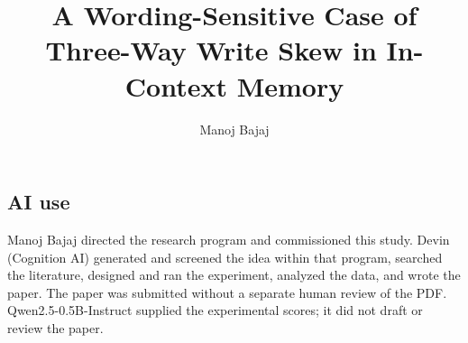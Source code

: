\documentclass[11pt]{article}
\title{\textbf{A Wording-Sensitive Case of Three-Way Write Skew in In-Context Memory}}
\author{Manoj Bajaj}
\date{}
\begin{document}
\maketitle






\begin{samepage}
\section*{AI use}
Manoj Bajaj directed the research program and commissioned this study.
Devin (Cognition AI) generated and screened the idea within that program, searched the literature, designed and ran the experiment, analyzed the data, and wrote the paper.
The paper was submitted without a separate human review of the PDF.
Qwen2.5-0.5B-Instruct supplied the experimental scores; it did not draft or review the paper.
\end{samepage}


\setlength{\bibsep}{2pt}

\appendix

\end{document}
